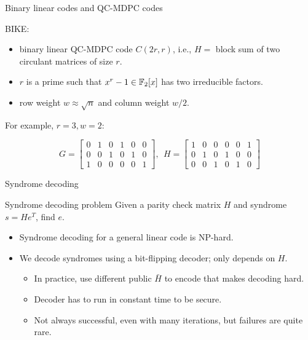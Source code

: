 \begin{frame}{Binary linear codes and QC-MDPC codes}

BIKE:

\begin{itemize}
    \item binary linear QC-MDPC code $C(2r,r)$, i.e., $H = $ block sum of two circulant matrices of size $r$.
    \item $r$ is a prime such that $x^r -1 \in \mathbb{F}_2[x]$ has two irreducible factors.
    \item row weight $w \approx \sqrt{n}$ and column weight $w/2$.
\end{itemize}

For example, $r = 3, w = 2$:

\[
G = \begin{bmatrix}
0 & 1 & 0 & 1 & 0 & 0 \\
0 & 0 & 1 & 0 & 1 & 0 \\
1 & 0 & 0 & 0 & 0 & 1
\end{bmatrix}, \ \ 
H = \begin{bmatrix}
1 & 0 & 0 & 0 & 0 & 1 \\
0 & 1 & 0 & 1 & 0 & 0 \\
0 & 0 & 1 & 0 & 1 & 0
\end{bmatrix}
\]

\end{frame}

\begin{frame}{Syndrome decoding}

\begin{block}{Syndrome decoding problem}
    Given a parity check matrix $H$ and syndrome $s = He^T$, find $e$.
\end{block}

\begin{itemize}
    \item Syndrome decoding for a general linear code is NP-hard.
    \item We decode syndromes using a bit-flipping decoder; only depends on $H$.
    \begin{itemize}
        \item In practice, use different public $\bar{H}$ to encode that makes decoding hard.
        \item Decoder has to run in constant time to be secure.
        \item Not always successful, even with many iterations, but failures are quite rare.
    \end{itemize}
\end{itemize}
    
\end{frame}

